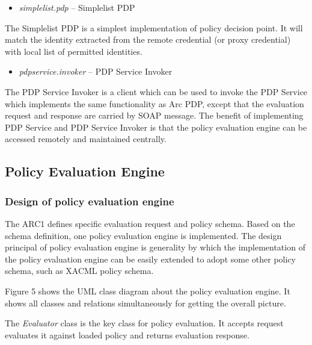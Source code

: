 \documentclass{article}
\newcommand\liststyleWWviiiNumxiii{%
\renewcommand\labelitemi{[F0B7?]}
\renewcommand\labelitemii{[F0B7?]}
\renewcommand\labelitemiii{[F0B7?]}
\renewcommand\labelitemiv{[F0B7?]}
}
\newcounter{Figure}
\begin{document}
\liststyleWWviiiNumxiii
\begin{itemize}
\item {\color{black}
\textit{simplelist.pdp} -- Simplelist PDP}
\end{itemize}
{\upshape\color{black}
The Simplelist PDP is a simplest implementation of policy decision
point. It will match the identity extracted from the remote credential
(or proxy credential) with local list of permitted identities.}

\liststyleWWviiiNumxiii
\begin{itemize}
\item {\color{black}
\textit{pdpservice.invoker} -- PDP Service Invoker}
\end{itemize}
{\upshape\color{black}
The PDP Service Invoker is a client which can be used to invoke the PDP
Service which implements the same functionality as Arc PDP, except that
the evaluation request and response are carried by SOAP message. The
benefit of implementing PDP Service and PDP Service Invoker is that the
policy evaluation engine can be accessed remotely and maintained
centrally.}

\subsection[Policy Evaluation Engine]{Policy Evaluation Engine}
\subsubsection{Design of policy evaluation engine}
{\upshape\color{black}
The ARC1 defines specific evaluation request and policy schema. Based on
the schema definition, one policy evaluation engine is implemented. The
design principal of policy evaluation engine is generality by which the
implementation of the policy evaluation engine can be easily extended
to adopt some other policy schema, such as XACML policy schema.}

{\upshape\color{black}
Figure 5 shows the UML class diagram about the policy evaluation engine.
It shows all classes and relations simultaneously for getting the
overall picture. }

{\upshape\color{black}
The \textit{Evaluator} class is the key class for policy evaluation. It
accepts request evaluates it against loaded policy and returns
evaluation response. }
\end{document}
